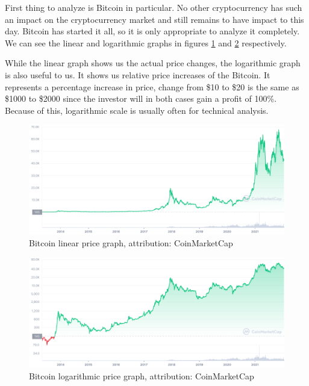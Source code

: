First thing to analyze is Bitcoin in particular. No other cryptocurrency has such an impact on the cryptocurrency market and still remains to have impact to this day. Bitcoin has started it all, so it is only appropriate to analyze it completely. We can see the linear and logarithmic graphs in figures \ref{btc-linear-figure} and \ref{btc-log-figure} respectively.

While the linear graph shows us the actual price changes, the logarithmic graph is also useful to us. It shows us relative price increases of the Bitcoin. It represents a percentage increase in price, change from \$10 to \$20 is the same as \$1000 to \$2000 since the investor will in both cases gain a profit of 100\%. Because of this, logarithmic scale is usually often for technical analysis.

\begin{figure}[ht]
    \centering
    \includegraphics[width=\columnwidth]{figures/BTC_ALL_linear.png}
    \caption{Bitcoin linear price graph, attribution: CoinMarketCap \cite{coinmarketcap}}
    \label{btc-linear-figure}
\end{figure}

\begin{figure}[ht]
    \centering
    \includegraphics[width=\columnwidth]{figures/BTC_ALL_log.png}
    \caption{Bitcoin logarithmic price graph, attribution: CoinMarketCap \cite{coinmarketcap}}
    \label{btc-log-figure}
\end{figure}

